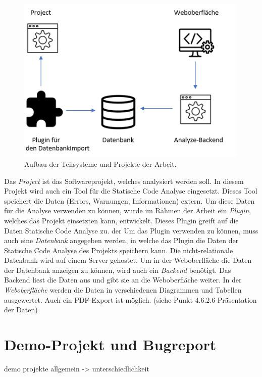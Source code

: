 \begin{figure}[tp]
  \centering
  \includegraphics[height=8cm]{images/infrastruktur.PNG}
 \caption[Aufbau der Teilsysteme und Projekte der Arbeit]{Aufbau der Teilsysteme und Projekte der Arbeit.}
  \label{fig:engine}
\end{figure}

Das \textit{Project} ist das Softwareprojekt, welches analysiert werden soll. In diesem Projekt wird auch ein Tool für die Statische Code Analyse eingesetzt. Dieses Tool speichert die Daten (Errors, Warnungen, Informationen) extern. Um diese Daten für die Analyse verwenden zu können, wurde im Rahmen der Arbeit ein \textit{Plugin}, welches das Projekt einsetzten kann, entwickelt. Dieses Plugin greift auf die Daten Statische Code Analyse zu. der Um das Plugin verwenden zu können, muss auch eine \textit{Datenbank} angegeben werden, in welche das Plugin die Daten der Statische Code Analyse des Projekts speichern kann. Die nicht-relationale Datenbank wird auf einem Server gehostet. Um in der Weboberfläche die Daten der Datenbank anzeigen zu können, wird auch ein \textit{Backend} benötigt. Das Backend liest die Daten aus und gibt sie an die Weboberfläche weiter. In der \textit{Weboberfläche} werden die Daten in verschiedenen Diagrammen und Tabellen ausgewertet. Auch ein PDF-Export ist möglich. (siehe Punkt 4.6.2.6 Präsentation der Daten)


\section{Demo-Projekt und Bugreport}
demo projekte allgemein -> unterschiedlichkeit

